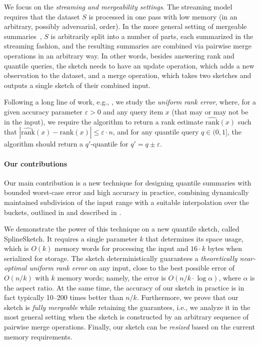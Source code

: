 \documentclass[acmsmall]{acmart}
\newcommand{\eps}{\varepsilon}
\newcommand{\rank}{\mathrm{rank}}
\newcommand{\estRank}{\widehat{\rank}}
\theoremstyle{remark}
\begin{document}
	We focus on the \emph{streaming and mergeability settings}. The streaming model requires that the dataset $S$ is
	processed in one pass with low memory (in an arbitrary, possibly adversarial, order).
	In the more general setting of mergeable summaries~\cite{AgarwalCHPWY13},
	$S$ is arbitrarily split into a number of parts, each summarized in the streaming fashion,
	and the resulting summaries are combined via pairwise merge operations in an arbitrary way.
	In other words, besides answering rank and quantile queries,
	the sketch needs to have an update operation, which adds a new observation to the dataset,
	and a merge operation, which takes two sketches and outputs a single sketch of their combined input.

	Following a long line of work, e.g., \cite{shrivastava2004medians,greenwald2001space,AgarwalCHPWY13,KarninLL16,luo16_quantiles_experimental,CormodeV20,AssadiJPS23-GK_weighted,GuptaSW24optimaQS-non-comp,GribelyukSWY24_GK-KG_sketch},
	we study the \emph{uniform rank error}, where, for a given accuracy parameter $\eps > 0$ and any query item $x$ (that may or may not be in the input), we require
	the algorithm to return a rank estimate $\estRank(x)$ such that
	$|\estRank(x) - \rank(x)| \le \eps \cdot n$,
	and for any quantile query $q\in (0, 1]$, the algorithm should return a $q'$-quantile for $q' = q \pm \eps$.




\paragraph{Our contributions}
Our main contribution is a new technique for designing quantile summaries with bounded worst-case error and high accuracy in practice, combining dynamically maintained subdivision of the input range with a suitable interpolation
over the buckets, outlined in  and described in .

We demonstrate the power of this technique on a new quantile sketch, called SplineSketch.
It  requires a single parameter $k$ that determines its space usage, which
is $O(k)$ memory words for processing the input and $16\cdot k$ bytes when serialized for storage.
The sketch deterministically guarantees a \emph{theoretically near-optimal uniform rank error} on any input, close to the best possible error of $O(n/k)$
with $k$ memory words; namely, the error is $O(n/k \cdot \log \alpha)$,
where $\alpha$ is the aspect ratio. %
At the same time, the accuracy of our sketch in practice is in fact typically 10--200 times better than $n/k$.
Furthermore, we prove that our sketch is \emph{fully mergeable} while retaining the guarantees, i.e., we analyze it in the most general setting when the sketch is constructed by an arbitrary sequence of pairwise merge operations.
Finally, our sketch can be \emph{resized} based on the current memory requirements.
\end{document}
